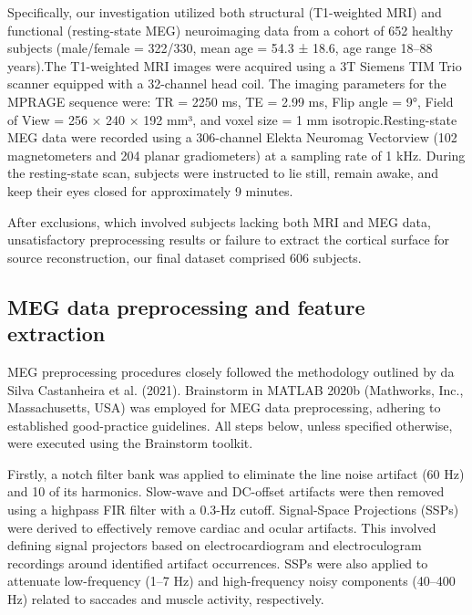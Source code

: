 \documentclass{cys}
\begin{document}
\bigskip 
Specifically, our investigation utilized both structural (T1-weighted MRI) and functional (resting-state MEG) neuroimaging data from a cohort of 652 healthy subjects (male/female = 322/330, mean age = 54.3 ± 18.6, age range 18–88 years).The T1-weighted MRI images were acquired using a 3T Siemens TIM Trio scanner equipped with a 32-channel head coil. The imaging parameters for the MPRAGE sequence were: TR = 2250 ms, TE = 2.99 ms, Flip angle = 9°, Field of View = 256 × 240 × 192 mm³, and voxel size = 1 mm isotropic.Resting-state MEG data were recorded using a 306-channel Elekta Neuromag Vectorview (102 magnetometers and 204 planar gradiometers) at a sampling rate of 1 kHz. During the resting-state scan, subjects were instructed to lie still, remain awake, and keep their eyes closed for approximately 9 minutes. 

\bigskip 
After exclusions, which involved subjects lacking both MRI and MEG data, unsatisfactory preprocessing results or failure to extract the cortical surface for source reconstruction, our final dataset comprised 606 subjects.

\bigskip
\subsection{MEG data preprocessing and feature extraction}

MEG preprocessing procedures closely followed the methodology outlined by da Silva Castanheira et al. (2021). Brainstorm in MATLAB 2020b (Mathworks, Inc., Massachusetts, USA) was employed for MEG data preprocessing, adhering to established good-practice guidelines. All steps below, unless specified otherwise, were executed using the Brainstorm toolkit.

\bigskip
Firstly, a notch filter bank was applied to eliminate the line noise artifact (60 Hz) and 10 of its harmonics. Slow-wave and DC-offset artifacts were then removed using a highpass FIR filter with a 0.3-Hz cutoff. Signal-Space Projections (SSPs) were derived to effectively remove cardiac and ocular artifacts. This involved defining signal projectors based on electrocardiogram and electroculogram recordings around identified artifact occurrences. SSPs were also applied to attenuate low-frequency (1–7 Hz) and high-frequency noisy components (40–400 Hz) related to saccades and muscle activity, respectively.
\end{document}
